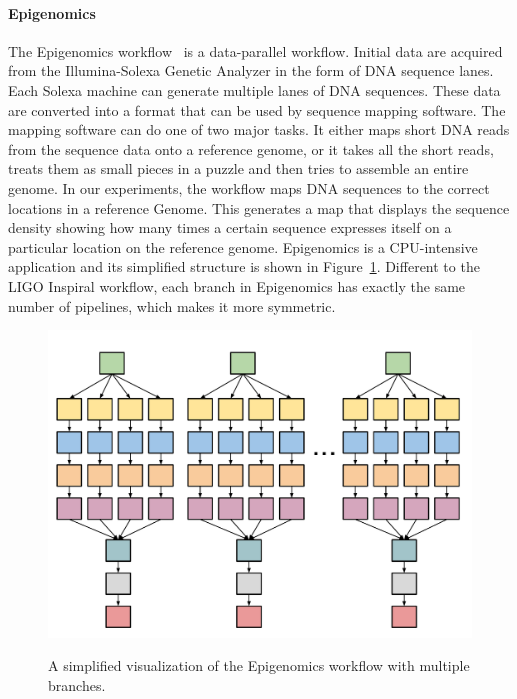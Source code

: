 \paragraph{\textbf{Epigenomics}}
The Epigenomics workflow~\cite{Epigenome} is a data-parallel workflow. Initial data are acquired from the Illumina-Solexa Genetic Analyzer in the form of DNA sequence lanes. Each Solexa machine can generate multiple lanes of DNA sequences. These data are converted into a format that can be used by sequence mapping software. The mapping software can do one of two major tasks. It either maps short DNA reads from the sequence data onto a reference genome, or it takes all the short reads, treats them as small pieces in a puzzle and then tries to assemble an entire genome. In our experiments, the workflow maps DNA sequences to the correct locations in a reference Genome. This generates a map that displays the sequence density showing how many times a certain sequence expresses itself on a particular location on the reference genome. Epigenomics is a CPU-intensive application and its simplified structure is shown in Figure~\ref{fig:evaluation_shape_genome}. Different to the LIGO Inspiral workflow, each branch in Epigenomics has exactly the same number of pipelines, which makes it more symmetric. 

\begin{figure}[htb]
	\centering
	\includegraphics[width=\linewidth]{figure17.pdf} \\
	\caption{A simplified visualization of the Epigenomics workflow with multiple branches.}
	\label{fig:evaluation_shape_genome}
\end{figure}

